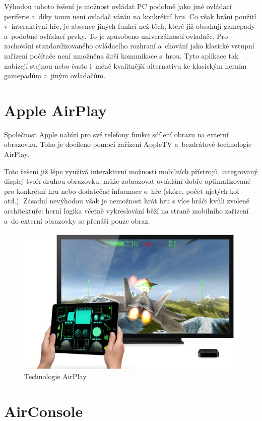 \documentclass[thesis=B,czech,hidelinks]{FITthesis}[2012/06/26] %
\begin{document}
Výhodou tohoto řešení je možnost ovládat PC podobně jako jiné ovládací periferie a~díky tomu není ovladač vázán na konkrétní hru. Co však brání použití v~interaktivní hře, je absence jiných funkcí než těch, které již obsahují gamepady a~podobné ovládací prvky. To je způsobeno univerzálností ovladače. Pro zachování standardizovaného ovládacího rozhraní a~chování jako klasické vstupní zařízení počítače není umožněna širší komunikace s~hrou. Tyto aplikace tak nabízejí stejnou nebo často i~méně kvalitnější alternativu ke klasickým herním gamepadům a~jiným ovladačům. 

\section{Apple AirPlay}

Společnost Apple nabízí pro své telefony funkci sdílení obrazu na externí obrazovku. Toho je docíleno pomocí zařízení AppleTV a~bezdrátové technologie AirPlay\cite{airplay}.

Toto řešení již lépe využívá interaktivní možnosti mobilních přístrojů, integrovaný displej tvoří druhou obrazovku, může zobrazovat ovládání dobře optimalizované pro konkrétní hru nebo dodatečné informace o~hře (skóre, počet ujetých kol atd.). Zásadní nevýhodou však je nemožnost hrát hru s více hráči kvůli zvolené architektuře: herní logika včetně vykreslování běží na straně mobilního zařízení a~do externí obrazovky se přenáší pouze obraz.

\begin{figure}[h]
\includegraphics[width=\textwidth]{airplay}
\caption{Technologie AirPlay\cite{airplay}}
\end{figure}


\section{AirConsole}
\end{document}

